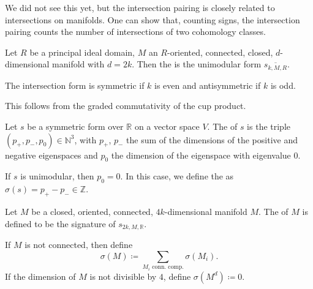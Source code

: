 

\begin{oral}
  We did not see this yet, but the intersection pairing
  is closely related to intersections on manifolds.
  One can show that, counting signs, the intersection pairing
  counts the number of intersections of two
  cohomology classes.
\end{oral}

\begin{definition}
  \label{def:unimodular-form-on-manifold-of-even-dimension}
  Let $R$ be a principal ideal domain,
  $M$ an $R$-oriented, connected, closed,
  $d$-dimensional manifold with $d=2k$.
  Then the  is the unimodular form
  $\overline{s_{k,M,R}}$.
\end{definition}

\begin{remark}
  The intersection form is symmetric if $k$ is even
  and antisymmetric if $k$ is odd.

  This follows from the graded commutativity of the cup product.
\end{remark}


\begin{definition}
  \label{def:signature-of-form}
  Let $s$ be a symmetric form over $\mathbb{R}$
  on a vector space $V$.
  The  of $s$ is the triple
  $(p_{+}, p_{-}, p_0) \in \mathbb{N}^3$,
  with $p_{+}$, $p_{-}$ the sum of the dimensions of the
  positive and negative eigenspaces and $p_0$ the dimension
  of the eigenspace with eigenvalue $0$.

  If $s$ is unimodular, then $p_0=0$.
  In this case, we define the   as
  $σ(s) = p_{+} - p_{-} \in \mathbb{Z}$.
\end{definition}


\begin{definition}
  \label{def:signature-of-manifold}
  Let $M$ be a closed, oriented, connected,
  $4k$-dimensional manifold $M$.
  The  of $M$ is defined to be the
  signature of $s_{2k, M, \mathbb{R}}$.

  If $M$ is not connected, then define
  \[
    σ(M) \coloneqq \sum_{\text{$M_i$ conn. comp.}} σ(M_i)
  .\]
  If the dimension of $M$ is not divisible by $4$,
  define $σ(M^d) \coloneqq 0$.
\end{definition}

